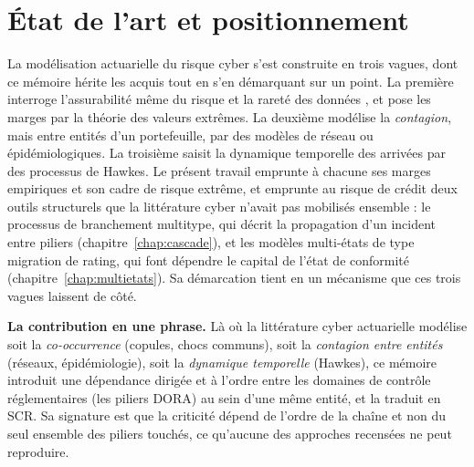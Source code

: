\chapter{État de l'art et positionnement}
\label{ch:positionnement}


La modélisation actuarielle du risque cyber s'est construite en trois vagues, dont ce
mémoire hérite les acquis tout en s'en démarquant sur un point. La première interroge
l'assurabilité même du risque et la rareté des données \citep{BienerElingWirfs2015},
et pose les marges par la théorie des valeurs extrêmes. La deuxième modélise la
\emph{contagion}, mais entre entités d'un portefeuille, par des modèles de réseau ou
épidémiologiques. La troisième saisit la dynamique temporelle des arrivées par des
processus de Hawkes. Le présent travail emprunte à chacune ses marges empiriques et son
cadre de risque extrême, et emprunte au risque de crédit deux outils structurels que la
littérature cyber n'avait pas mobilisés ensemble : le processus de branchement
multitype, qui décrit la propagation d'un incident entre piliers (chapitre~\ref{chap:cascade}),
et les modèles multi-états de type migration de rating, qui font dépendre le
capital de l'état de conformité (chapitre~\ref{chap:multietats}). Sa démarcation tient en un
mécanisme que ces trois vagues laissent de côté.

\begin{cle}
\textbf{La contribution en une phrase.} Là où la littérature cyber actuarielle modélise soit
la \emph{co-occurrence} (copules, chocs communs), soit la \emph{contagion entre entités}
(réseaux, épidémiologie), soit la \emph{dynamique temporelle} (Hawkes), ce mémoire introduit
une dépendance dirigée et à l'ordre entre les domaines de contrôle réglementaires
(les piliers DORA) au sein d'une même entité, et la traduit en SCR. Sa signature est que
la criticité dépend de l'ordre de la chaîne et non du seul ensemble des piliers
touchés, ce qu'aucune des approches recensées ne peut reproduire.
\end{cle}

